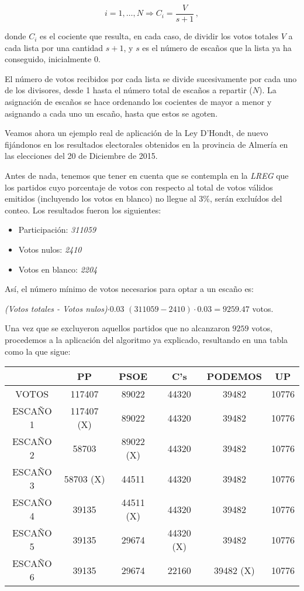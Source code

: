 \documentclass[11pt]{article}
\begin{document}
	$$i = 1,\ldots,N \Rightarrow C_i = \dfrac{V}{s + 1}\, ,$$
	
	donde $C_i$ es el cociente que resulta, en cada caso, de dividir los votos totales $V$ a cada lista por una cantidad $s + 1$, y $s$ es el número de escaños que la lista ya ha conseguido, inicialmente 0.
	
	El número de votos recibidos por cada lista se divide sucesivamente por cada uno de los divisores, desde 1 hasta el número total de escaños a repartir ($N$). La asignación de escaños se hace ordenando los cocientes de mayor a menor y asignando a cada uno un escaño, hasta que estos se agoten.
	
	Veamos ahora un ejemplo real de aplicación de la Ley D'Hondt, de nuevo fijándonos en los resultados electorales obtenidos en la provincia de Almería en las elecciones del 20 de Diciembre de 2015.
	
	Antes de nada, tenemos que tener en cuenta que se contempla en la \textit{LREG} que los partidos cuyo porcentaje de votos con respecto al total de votos válidos emitidos (incluyendo los votos en blanco) no llegue al 3\%, serán excluídos del conteo. Los resultados fueron los siguientes:
	
	\begin{itemize}
	\item Participación: \textit{311059}
	\item Votos nulos: \textit{2410}
	\item Votos en blanco: \textit{2204} 
	\end{itemize}
	
	Así, el número mínimo de votos necesarios para optar a un escaño es:
	\begin{center}
	 \textit{(Votos totales - Votos nulos)$\cdot 0.03$} $(311059 - 2410)\cdot 0.03 = 9259.47$ votos.
	\end{center}
	
	Una vez que se excluyeron aquellos partidos que no alcanzaron $9259$ votos, procedemos a la aplicación del algoritmo ya explicado, resultando en una tabla como la que sigue:
	
	\begin{center}
	\begin{tabular}{|c|c|c|c|c|c|}
	\hline
	 & \textbf{PP} & \textbf{PSOE} & \textbf{C's} & \textbf{PODEMOS} & \textbf{UP} \\
	\hline
	VOTOS & 117407 & 89022 & 44320 & 39482 & 10776 \\
	\hline
	ESCAÑO 1 & 117407 (X) & 89022 & 44320 & 39482 & 10776 \\
	\hline
	ESCAÑO 2 & 58703 & 89022 (X) & 44320 & 39482 & 10776 \\
	\hline
	ESCAÑO 3 & 58703 (X) & 44511 & 44320 & 39482 & 10776 \\
	\hline
	ESCAÑO 4 & 39135 & 44511 (X) & 44320 & 39482 & 10776 \\
	\hline
	ESCAÑO 5 & 39135 & 29674 & 44320 (X) & 39482 & 10776 \\
	\hline
	ESCAÑO 6 & 39135 & 29674 & 22160 & 39482 (X) & 10776 \\
	\hline
\end{tabular}
\end{center}
\end{document}
